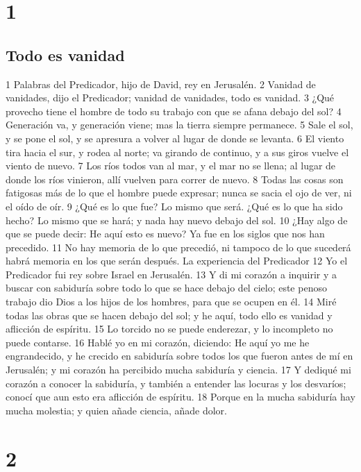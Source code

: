 
\chapter{1}

\section*{Todo es vanidad}

1 Palabras del Predicador, hijo de David, rey en Jerusalén. 
2 Vanidad de vanidades, dijo el Predicador; vanidad de vanidades, todo es vanidad.
3 ¿Qué provecho tiene el hombre de todo su trabajo con que se afana debajo del sol?
4 Generación va, y generación viene; mas la tierra siempre permanece.
5 Sale el sol, y se pone el sol, y se apresura a volver al lugar de donde se levanta.
6 El viento tira hacia el sur, y rodea al norte; va girando de continuo, y a sus giros vuelve el viento de nuevo.
7 Los ríos todos van al mar, y el mar no se llena; al lugar de donde los ríos vinieron, allí vuelven para correr de nuevo.
8 Todas las cosas son fatigosas más de lo que el hombre puede expresar; nunca se sacia el ojo de ver, ni el oído de oír.
9 ¿Qué es lo que fue? Lo mismo que será. ¿Qué es lo que ha sido hecho? Lo mismo que se hará; y nada hay nuevo debajo del sol.
10 ¿Hay algo de que se puede decir: He aquí esto es nuevo? Ya fue en los siglos que nos han precedido.
11 No hay memoria de lo que precedió, ni tampoco de lo que sucederá habrá memoria en los que serán después.
La experiencia del Predicador
12 Yo el Predicador fui rey sobre Israel en Jerusalén.
13 Y di mi corazón a inquirir y a buscar con sabiduría sobre todo lo que se hace debajo del cielo; este penoso trabajo dio Dios a los hijos de los hombres, para que se ocupen en él.
14 Miré todas las obras que se hacen debajo del sol; y he aquí, todo ello es vanidad y aflicción de espíritu.
15 Lo torcido no se puede enderezar, y lo incompleto no puede contarse. 
16 Hablé yo en mi corazón, diciendo: He aquí yo me he engrandecido, y he crecido en sabiduría sobre todos los que fueron antes de mí en Jerusalén; y mi corazón ha percibido mucha sabiduría y ciencia.
17 Y dediqué mi corazón a conocer la sabiduría, y también a entender las locuras y los desvaríos; conocí que aun esto era aflicción de espíritu.
18 Porque en la mucha sabiduría hay mucha molestia; y quien añade ciencia, añade dolor.

\chapter{2}

